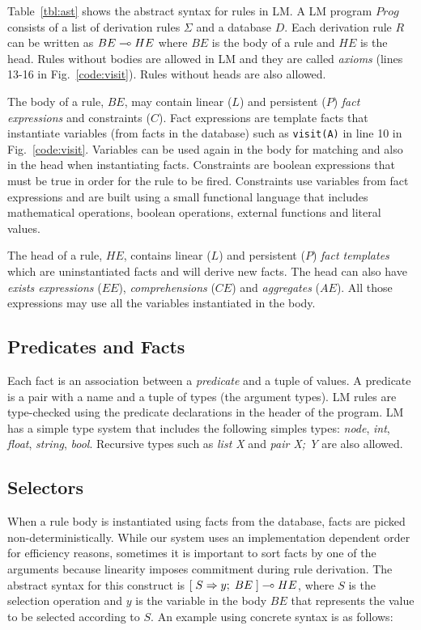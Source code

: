 \renewcommand{\arraystretch}{1.0}

Table~\ref{tbl:ast} shows the abstract syntax for rules in LM.  A LM program
$Prog$ consists of a list of derivation rules $\Sigma$ and a database $D$.  Each
derivation rule $R$ can be written as $BE \multimap HE$ where $BE$ is the body of a
rule and $HE$ is the head. Rules without bodies are allowed in LM and they are
called \textit{axioms} (lines 13-16 in Fig.~\ref{code:visit}). Rules without
heads are also allowed.

The body of a rule, $BE$, may contain linear ($L$) and persistent ($P$)
\emph{fact expressions} and constraints ($C$). Fact expressions are template
facts that instantiate variables (from facts in the database) such as
\texttt{visit(A)} in line 10 in Fig.~\ref{code:visit}. Variables can be used
again in the body for matching and also in the head when instantiating facts.
Constraints are boolean expressions that must be true in order for the rule
to be fired. Constraints use variables from fact expressions and are built
using a small functional language that includes mathematical operations,
boolean operations, external functions and literal values.

The head of a rule, $HE$, contains linear ($L$) and persistent ($P$) \emph{fact
templates} which are uninstantiated facts and will derive new facts. The head
can also have \emph{exists expressions} ($EE$), \emph{comprehensions} ($CE$)
and \emph{aggregates} ($AE$). All those expressions may use all the variables
instantiated in the body.

\subsection{Predicates and Facts}

Each fact is an association between a \emph{predicate} and a tuple of values. A
predicate is a pair with a name and a tuple of types (the argument types). LM
rules are type-checked using the predicate declarations in the header of the
program. LM has a simple type system that includes the following simples types:
\emph{node}, \emph{int}, \emph{float}, \emph{string}, \emph{bool}. Recursive
types such as \emph{list X} and \emph{pair X; Y} are also allowed.

\subsection{Selectors}

When a rule body is instantiated using facts from the database, facts are picked
non-deterministically. While our system uses an implementation dependent order
for efficiency reasons, sometimes it is important to sort facts by one of the
arguments because linearity imposes commitment during rule derivation. The
abstract syntax for this construct is $[\; S \Rightarrow y; \; BE \;] \multimap HE$, where $S$ is
the selection operation and $y$ is the variable in the body $BE$ that represents
the value to be selected according to $S$. An example using concrete syntax is
as follows:

